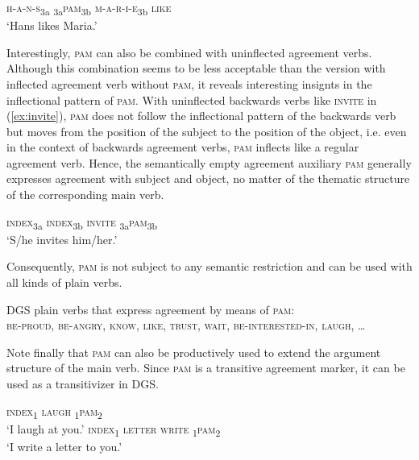 \documentclass[11pt,a4paper,fleqn]{article}
\begin{document}
\begin{exe}
\ex	 \textsc{h-a-n-s}\textsubscript{3a}  \textsubscript{3a}\textsc{pam}\textsubscript{3b}  \textsc{m-a-r-i-e}\textsubscript{3b}  \textsc{like} \\
‘Hans likes Maria.’\label{ex:hans}
\end{exe}

Interestingly, \textsc{pam} can also be combined with uninflected agreement verbs. Although this combination seems to be less acceptable than the version with inflected agreement verb without \textsc{pam}, it reveals interesting insignts in the inflectional pattern of \textsc{pam}. With uninflected backwards verbs like \textsc{invite} in (\ref{ex:invite}), \textsc{pam} does not follow the inflectional pattern of the backwards verb but moves from the position of the subject to the position of the object, i.e. even in the context of backwards agreement verbs, \textsc{pam} inflects like a regular agreement verb. Hence, the semantically empty agreement auxiliary \textsc{pam} generally expresses agreement with subject and object, no matter of the thematic structure of the corresponding main verb. 

\begin{exe}

\ex	\textsc{index}\textsubscript{3a}  \textsc{index}\textsubscript{3b}  \textsc{invite}  \textsubscript{3a}\textsc{pam}\textsubscript{3b} \\
		‘S/he invites him/her.’  \label{ex:invite}
\end{exe}

Consequently, \textsc{pam} is not subject to any semantic restriction and can be used with all kinds of plain verbs.

\begin{exe}
\ex	DGS plain verbs that express agreement by means of \textsc{pam}: \\
\textsc{be-proud, be-angry, know, like, trust, wait, be-interested-in, laugh}, …
\end{exe}

Note finally that \textsc{pam} can also be productively used to extend the argument structure of the main verb. Since \textsc{pam} is a transitive agreement marker, it can be used as a transitivizer in DGS.

\begin{exe}
\ex \label{ex:laugh}
\begin{xlist}	
\ex 		\textsc{index}\textsubscript{1}  \textsc{laugh}  \textsubscript{1}\textsc{pam}\textsubscript{2}	\\
‘I laugh at you.’
\ex	\textsc{index}\textsubscript{1}  \textsc{letter write}  \textsubscript{1}\textsc{pam}\textsubscript{2}\\
‘I write a letter to you.’
\end{xlist}	
\end{exe}
\end{document}
